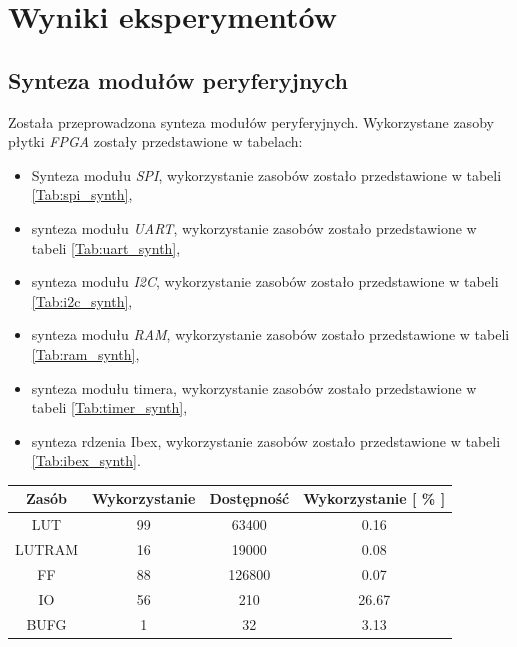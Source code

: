 \documentclass[11pt,a4paper]{article}
\begin{document}
\newpage
\section{Wyniki eksperymentów}
\subsection{Synteza modułów peryferyjnych}
\hspace{5mm}
	Została przeprowadzona synteza modułów peryferyjnych. Wykorzystane zasoby płytki \textit{FPGA} zostały przedstawione w tabelach:
\begin{itemize}
	\item Synteza modułu \textit{SPI}, wykorzystanie zasobów zostało przedstawione w tabeli \ref{Tab:spi_synth},
	\item synteza modułu \textit{UART}, wykorzystanie zasobów zostało przedstawione w tabeli \ref{Tab:uart_synth},
	\item synteza modułu \textit{I2C}, wykorzystanie zasobów zostało przedstawione w tabeli \ref{Tab:i2c_synth},
	\item synteza modułu \textit{RAM}, wykorzystanie zasobów zostało przedstawione w tabeli \ref{Tab:ram_synth},
	\item synteza modułu timera, wykorzystanie zasobów zostało przedstawione w tabeli \ref{Tab:timer_synth},
	\item synteza rdzenia Ibex, wykorzystanie zasobów zostało przedstawione w tabeli \ref{Tab:ibex_synth}.
\end{itemize}	
	 \begin{minipage}[c]{\textwidth}
		 \begin{center}
				\begin{tabular}{|c|c|c|c|}
					\hline
					Zasób & Wykorzystanie & Dostępność & Wykorzystanie [ \% ] \\ 
					\hline
					LUT & 99 & 63400 & 0.16  \\
					\hline
					LUTRAM & 16 & 19000 & 0.08  \\
					\hline
					FF & 88 & 126800 & 0.07 \\
					\hline
					IO & 56 & 210 & 26.67 \\
					\hline
					BUFG & 1 & 32 & 3.13 \\
					\hline
				\end{tabular}
		\end{center}
\end{minipage}\\
\end{document}
